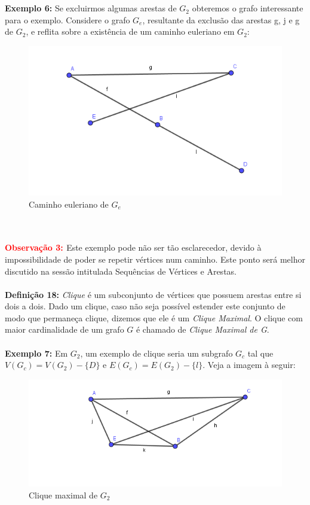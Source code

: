 \documentclass[a4paper,12pt]{article}
\begin{document}
	\\
	\\
	\textbf{Exemplo 6: }Se excluirmos algumas arestas de $G_2$ obteremos o grafo interessante para o exemplo. Considere o grafo $G_e$, resultante da exclusão das arestas g, j e g de $G_2$, e reflita sobre a existência de um caminho euleriano em $G_2$:
	\vspace{1.5cm}
	\begin{figure}[h]
		\center
		\includegraphics[width=0.7\linewidth]{caminhoeuleriano.png}
		\caption{Caminho euleriano de $G_e$}
		\label{}
	\end{figure}
	\\
	\\
	\textbf{\textcolor{Red}{Observação 3: }}Este exemplo pode não ser tão esclarecedor, devido à impossibilidade de poder se repetir vértices num caminho. Este ponto será melhor discutido na sessão intitulada Sequências de Vértices e Arestas. 
	\\
	\\
	\textbf{Definição 18: }\textit{Clique} é um subconjunto de vértices que possuem arestas entre si dois a dois. Dado um clique, caso não seja possível estender este conjunto de modo que permaneça clique, dizemos que ele é um \textit{Clique Maximal}. O clique com maior cardinalidade de um grafo $G$ é chamado de \textit{Clique Maximal de G}.
	\\
	\\
	\textbf{Exemplo 7: }Em $G_2$, um exemplo de clique seria um subgrafo $G_c$ tal que $V(G_c)=V(G_2)-\{D\}$ e $E(G_c)=E(G_2)-\{l\}$. Veja a imagem à seguir:
	\vspace{2cm}
	\begin{figure}[h]
		\center
		\includegraphics[width=0.6\linewidth]{cliquemaximal.png}
		\caption{Clique maximal de $G_2$}
		\label{}
	\end{figure}
\end{document}
